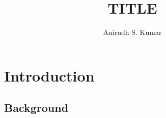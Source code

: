 \documentclass[letterpage, 11pt]{report}
\title{TITLE}
\author{Anirudh S. Kumar}
\begin{document}



\tableofcontents




\chapter{Introduction}\label{chapter:introduction}
\setcounter{page}{1}
\onehalfspacing

\section{Background}


\lipsum[1]
\lipsum[2]
\lipsum[3]\cite{10.7551/mitpress/8551.001.0001}

\lipsum[1]
\lipsum[2]
\lipsum[3]

\printbibliography
\end{document}
